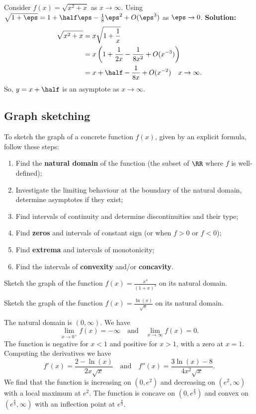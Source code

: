 \documentclass[12pt, a4paper]{article}
\begin{document}
\begin{mdexample}
    Consider \(f(x)=\sqrt{x^2+x}\) as \(x\to \infty\). Using \(\sqrt{1+\eps} = 1+\half\eps -\frac{1}{8}\eps^2+O(\eps^3)\) as \(\eps \to 0\).
    \textbf{Solution:}
    \[\begin{aligned}
        \sqrt{x^2+x} &= x\sqrt{1+\frac{1}{x}}\\
                    &=x\left( 1+\frac{1}{2x}-\frac{1}{8x^2} +O(x^{-3}) \right) \\
                    &=x+\half -\frac{1}{8x}+O(x^{-2}) \quad x\to \infty.
    \end{aligned}\]
    So, \(y=x+\half\) is an asymptote as \(x\to \infty\).
\end{mdexample}

\subsection{Graph sketching}

To sketch the graph of a concrete function \(f(x)\), given by an explicit formula, follow these steps:

\begin{enumerate}
    \item Find the \textbf{natural domain} of the function (the subset of \(\RR\) where \(f\) is well-defined);
    \item Investigate the limiting behaviour at the boundary of the natural domain, determine asymptotes if they exist;
    \item Find intervals of continuity and determine discontinuities and their type;
    \item Find \textbf{zeros} and intervals of constant sign (or when \(f>0\) or \(f < 0\));
    \item Find \textbf{extrema} and intervals of monotonicity;
    \item Find the intervals of \textbf{convexity} and/or \textbf{concavity}.
\end{enumerate}

\begin{example}
    Sketch the graph of the function \(f(x)=\frac{x^4}{(1+x)^3}\) on its natural domain.
\end{example}

\begin{example}
Sketch the graph of the function \(f(x)=\frac{\ln(x)}{\sqrt{x}}\) on its natural domain.
    \begin{solution}
    The natural domain is \((0,\infty)\). We have 
    \[\lim_{x\to 0^+} f(x)=-\infty \quad \text{and} \quad \lim_{x\to \infty} f(x)=0.\]
    The function is negative for \(x<1\) and positive for \(x>1\), with a zero at \(x=1\). Computing the derivatives we have 
    \[f'(x)=\frac{2-\ln(x)}{2x\sqrt{x}} \quad \text{and} \quad f''(x)=\frac{3\ln(x)-8}{4x^2\sqrt{x}}.\]
    We find that the function is increasing on \((0,e^2)\) and decreasing on \((e^2,\infty)\) with a local maximum at \(e^2\). The function is concave on \((0,e^\frac{8}{3})\) and convex on \((e^\frac{8}{3},\infty)\) with an inflection point at \(e^\frac{8}{3}\). 
    \end{solution}
\end{example}
\end{document}
